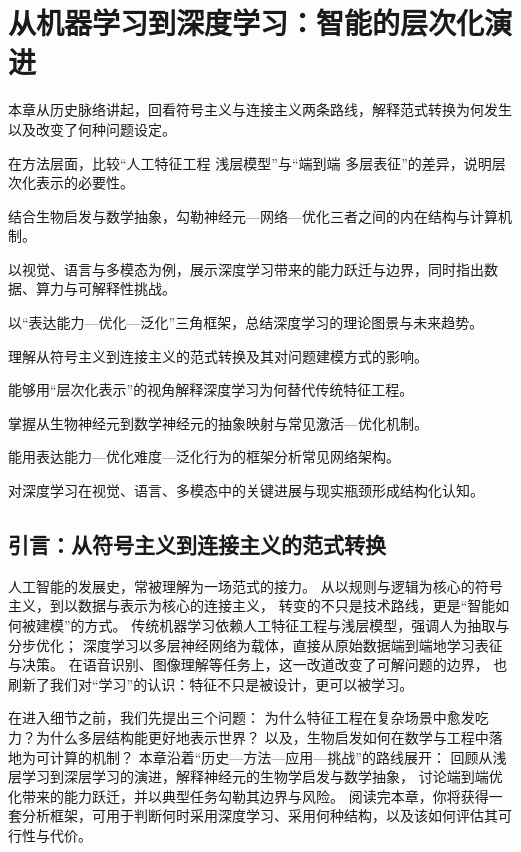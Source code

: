 \chapter{从机器学习到深度学习：智能的层次化演进}

\begin{introduction}
  \item 本章从历史脉络讲起，回看符号主义与连接主义两条路线，解释范式转换为何发生以及改变了何种问题设定。
  \item 在方法层面，比较“人工特征工程  浅层模型”与“端到端  多层表征”的差异，说明层次化表示的必要性。
  \item 结合生物启发与数学抽象，勾勒神经元—网络—优化三者之间的内在结构与计算机制。
  \item 以视觉、语言与多模态为例，展示深度学习带来的能力跃迁与边界，同时指出数据、算力与可解释性挑战。
  \item 以“表达能力—优化—泛化”三角框架，总结深度学习的理论图景与未来趋势。
\end{introduction}

\begin{introduction}
  \item 理解从符号主义到连接主义的范式转换及其对问题建模方式的影响。
  \item 能够用“层次化表示”的视角解释深度学习为何替代传统特征工程。
  \item 掌握从生物神经元到数学神经元的抽象映射与常见激活—优化机制。
  \item 能用表达能力—优化难度—泛化行为的框架分析常见网络架构。
  \item 对深度学习在视觉、语言、多模态中的关键进展与现实瓶颈形成结构化认知。
\end{introduction}

\section{引言：从符号主义到连接主义的范式转换}

人工智能的发展史，常被理解为一场范式的接力。  
从以规则与逻辑为核心的符号主义，到以数据与表示为核心的连接主义，  
转变的不只是技术路线，更是“智能如何被建模”的方式。  
传统机器学习依赖人工特征工程与浅层模型，强调人为抽取与分步优化；  
深度学习以多层神经网络为载体，直接从原始数据端到端地学习表征与决策。  
在语音识别、图像理解等任务上，这一改道改变了可解问题的边界，  
也刷新了我们对“学习”的认识：特征不只是被设计，更可以被学习。

在进入细节之前，我们先提出三个问题：  
为什么特征工程在复杂场景中愈发吃力？为什么多层结构能更好地表示世界？  
以及，生物启发如何在数学与工程中落地为可计算的机制？  
本章沿着“历史—方法—应用—挑战”的路线展开：  
回顾从浅层学习到深层学习的演进，解释神经元的生物学启发与数学抽象，  
讨论端到端优化带来的能力跃迁，并以典型任务勾勒其边界与风险。  
阅读完本章，你将获得一套分析框架，可用于判断何时采用深度学习、采用何种结构，以及该如何评估其可行性与代价。

